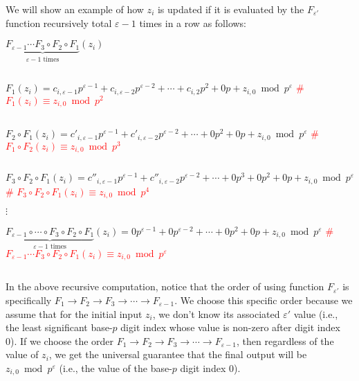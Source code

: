 We will show an example of how $z_i$ is updated if it is evaluated by the $F_{\varepsilon'}$ function recursively total $\varepsilon-1$ times in a row as follows:

$\underbrace{F_{\varepsilon-1} \cdots F_{3} \circ F_{2} \circ  F_{1}}_{\varepsilon-1 \text{ times}}(z_i)$

$ $

 $F_{1}(z_i) = c_{i,\varepsilon-1}p^{\varepsilon-1} + c_{i,\varepsilon-2}p^{\varepsilon-2} + \cdots + c_{i, 2}p^2 + 0p + z_{i, 0} \bmod p^\varepsilon$ \textcolor{red}{ \# $F_{1}(z_i) \equiv z_{i,0} \bmod p^2$}

$ $

 $F_{2} \circ F_{1}(z_i) = c'_{i,\varepsilon-1}p^{\varepsilon-1} + c'_{i,\varepsilon-2}p^{\varepsilon-2} + \cdots + 0p^2 + 0p + z_{i, 0} \bmod p^\varepsilon$  \textcolor{red}{ \# $F_{1} \circ F_{2}(z_i) \equiv z_{i,0} \bmod p^3$} 

$ $

 $F_{3} \circ F_{2} \circ F_{1}(z_i) = c''_{i,\varepsilon-1}p^{\varepsilon-1} + c''_{i,\varepsilon-2}p^{\varepsilon-2} + \cdots + 0p^3 + 0p^2 + 0p + z_{i, 0} \bmod p^\varepsilon$  \textcolor{red}{ \# $F_{3} \circ F_{2} \circ F_{1}(z_i) \equiv z_{i,0} \bmod p^4$} 

$\vdots$

 $\underbrace{F_{\varepsilon-1}  \circ \cdots \circ F_{3} \circ F_{2} \circ F_{1}}_{\varepsilon-1 \text{ times}}(z_i) = 0p^{\varepsilon-1} + 0p^{\varepsilon-2} + \cdots + 0p^2 + 0p + z_{i, 0} \bmod p^\varepsilon$ \textcolor{red}{ \# $F_{\varepsilon-1} \cdots F_{3} \circ F_{2} \circ F_{1}(z_i) \equiv z_{i,0} \bmod p^\varepsilon$} 

$ $


In the above recursive computation, notice that the order of using function $F_{\varepsilon'}$ is specifically $F_{1} \rightarrow F_{2} \rightarrow F_{3} \rightarrow \cdots \rightarrow F_{\varepsilon -1}$. We choose this specific order because we assume that for the initial input $z_i$, we don't know its associated $\varepsilon'$ value (i.e., the least significant base-$p$ digit index whose value is non-zero after digit index 0). If we choose the order $F_{1} \rightarrow F_{2} \rightarrow F_{3} \rightarrow \cdots \rightarrow F_{\varepsilon -1}$, then regardless of the value of $z_i$, we get the universal guarantee that the final output will be $z_{i,0} \bmod p^\varepsilon$ (i.e., the value of the base-$p$ digit index 0).


